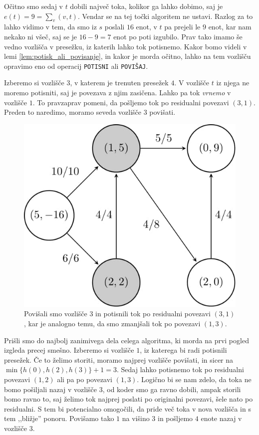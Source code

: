 \documentclass[mat1]{fmfdelo}
\begin{document}
Očitno smo sedaj v $t$ dobili največ toka, kolikor ga lahko dobimo, saj je $e(t) = 9 = \sum_v (v,t)$. Vendar se na tej točki algoritem ne ustavi. Razlog za to
lahko vidimo v tem, da smo iz $s$ poslali $16$ enot, v $t$ pa prejeli le $9$ enot, kar nam nekako ni všeč, saj se je $16-9 = 7$ enot po poti izgubilo. Prav tako
imamo še vedno vozlišča v presežku, iz katerih lahko tok potisnemo. Kakor bomo videli v lemi \ref{lem:potisk_ali_povisanje}, in kakor je morda očitno, lahko na tem
vozlišču opravimo eno od operacij \texttt{POTISNI} ali \texttt{POVIŠAJ}.

Izberemo si vozlišče $3$, v katerem je trenuten presežek $4$. V vozlišče $t$ iz njega ne moremo potisniti, saj je povezava z njim zasičena. Lahko pa tok \textit{vrnemo}
v vozlišče $1$. To pravzaprav pomeni, da pošljemo tok po residualni povezavi $(3,1)$. Preden to naredimo, moramo seveda vozlišče $3$ povišati.

\begin{figure}[H]
  \centering
  \includegraphics[scale=.358]{images/graf2-7/graf2-7-1.jpg}
  \caption{Povišali smo vozlišče $3$ in potisnili tok po residualni povezavi $(3,1)$, kar je analogno temu, da smo zmanjšali tok po povezavi $(1,3)$.}
\end{figure}

Prišli smo do najbolj zanimivega dela celega algoritma, ki morda na prvi pogled iz\-gle\-da precej smešno. Izberemo si vozlišče $1$, iz katerega bi radi
potisnili presežek. Če to želimo storiti, moramo najprej vozlišče povišati, in sicer na $\min\lbrace h(0), h(2), h(3)\rbrace + 1 = 3$. Sedaj lahko potisnemo tok po residualni
povezavi $(1,2)$ ali pa po povezavi $(1,3)$. Logično bi se nam zdelo, da toka ne bomo pošiljali nazaj v vozlišče $3$, od koder smo ga ravno dobili, ampak storili
bomo ravno to, saj želimo tok najprej poslati po originalni povezavi, šele nato po residualni. S tem bi potencialno omogočili, da pride več toka v nova vozlišča in s tem
,,bližje'' ponoru. Povišamo tako $1$ na višino $3$ in pošljemo $4$ enote nazaj v vozlišče $3$.
\end{document}
